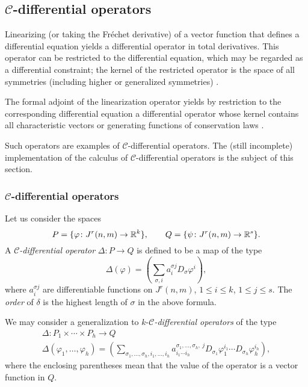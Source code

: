 \subsection[C-differential operators]{$\mathcal{C}$-differential operators}
\label{cdesec:mathc-diff-oper-1}

Linearizing (or taking the Fr\'echet derivative) of a vector function that
defines a differential equation yields a differential operator in total
derivatives. This operator can be restricted to the differential equation,
which may be regarded as a differential constraint; the kernel of the
restricted operator is the space of all symmetries (including higher or
generalized symmetries) \cite{Krasilshchik:99,Olver:93}.

The formal adjoint of the linearization operator yields by restriction to the
corresponding differential equation a differential operator whose kernel
contains all characteristic vectors or generating functions of conservation
laws \cite{Krasilshchik:99,Olver:93}.

Such operators are examples of $\mathcal{C}$-differential operators. The (still
incomplete) \REDUCE implementation of the calculus of
$\mathcal{C}$-differential operators is the subject of this section.

\subsubsection[C-differential operators]{$\mathcal{C}$-differential operators}
\label{cdesec:mathc-diff-oper}

Let us consider the spaces
\[
  P=\{\varphi\colon J^r(n,m)\to \mathbb{R}^k\},\qquad Q=\{\psi\colon J^r(n,m)\to \mathbb{R}^s\}.
\]
A \emph{$\mathcal{C}$-differential operator} $\Delta\colon P\to Q$ is defined
to be a map of the type
\begin{equation}\label{eq:4}
  \Delta(\varphi) = (\sum_{\sigma, i}a^{\sigma j}_i D_\sigma \varphi^i),
\end{equation}
where $a^{\sigma j}_i$ are differentiable functions on $J^r(n,m)$, $1\leq i\leq
k$, $1\leq j\leq s$. The \emph{order} of $\delta$ is the highest length of
$\sigma$ in the above formula.

We may consider a generalization to $k$-\emph{$\mathcal{C}$-differential
  operators} of the type
\begin{multline}\label{eq:7}
  \Delta\colon P_1\times\cdots\times P_h \to Q\\
  \Delta(\varphi_1,\dots,\varphi_h) =
  (\sum_{\sigma_1,\ldots,\sigma_h, i_1,\ldots,
    i_h}a^{\sigma_1,\ldots,\sigma_h,\ j}_{i_1\cdots i_h} D_{\sigma_1}
  \varphi_1^{i_1}\cdots D_{\sigma_h}\varphi_h^{i_h}),
\end{multline}
where the enclosing parentheses mean that the value of the operator is a vector
function in $Q$.

